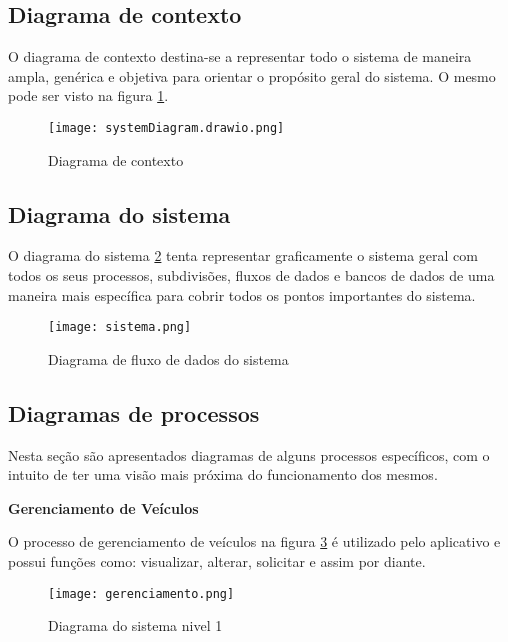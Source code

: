\subsection{Diagrama de contexto}
O diagrama de contexto destina-se a representar todo o sistema de maneira ampla, genérica e objetiva para orientar o propósito geral do sistema. O mesmo pode ser visto na figura \ref{contexto}.
\begin{figure}[H]
      \begin{center}
            \caption{Diagrama de contexto} \label{contexto}
            \texttt{[image: systemDiagram.drawio.png]} \\
      \end{center}
\end{figure}

\subsection{Diagrama do sistema}
O diagrama do sistema \ref{siste} tenta representar graficamente o sistema geral com todos os seus processos, subdivisões, fluxos de dados e bancos de dados de uma maneira mais específica para cobrir todos os pontos importantes do sistema.

\begin{figure}[H]
      \begin{center}
            \caption{Diagrama de fluxo de dados do sistema} \label{siste}
            \texttt{[image: sistema.png]} \\

      \end{center}
\end{figure}


\subsection{Diagramas de processos}
Nesta seção são apresentados diagramas de alguns processos específicos, com o intuito de ter uma
visão mais próxima do funcionamento dos mesmos.

\textbf{Gerenciamento de Veículos}

O processo de gerenciamento de veículos na figura \ref{gerenciamento} é utilizado pelo aplicativo e possui funções como: visualizar, alterar, solicitar e assim por diante.


\begin{figure}[H]
      \begin{center}
            \caption{Diagrama do sistema nivel 1} \label{gerenciamento}
            \texttt{[image: gerenciamento.png]} \\

      \end{center}
\end{figure}


